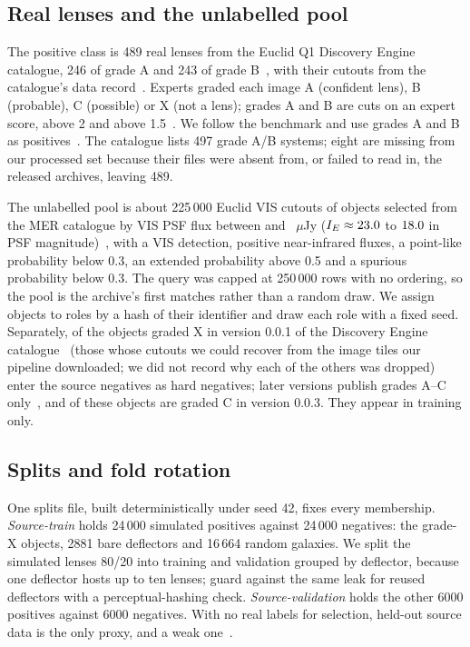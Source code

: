 \subsection{Real lenses and the unlabelled pool}

The positive class is 489 real lenses from the Euclid Q1 Discovery Engine catalogue, 246 of
grade A and 243 of grade B~\citep{discoveryengineA}, with their cutouts from the catalogue's
data record~\citep{discoveryenginecat}. Experts graded each image A (confident lens), B
(probable), C (possible) or X (not a lens); grades A and B are cuts on an expert score, above 2
and above 1.5~\citep[Sect.~6.2]{discoveryengineA}. We follow the benchmark and use grades A and B as
positives~\citep{lines2025simstosky}. The catalogue lists 497 grade A/B systems; eight are
missing from our processed set because their files were absent from, or failed to read in,
the released archives, leaving 489.

The unlabelled pool is about 225\,000 Euclid VIS cutouts of objects selected from the MER
catalogue by VIS PSF flux between \FluxMin{} and \FluxMax{}~$\mu$Jy ($I_E \approx 23.0{}$
to $18.0{}$ in PSF magnitude)~\citep{euclidq1mer}, with a VIS detection, positive
near-infrared fluxes, a point-like probability below 0.3, an extended probability above 0.5
and a spurious probability below 0.3. The query was capped at 250\,000 rows with no ordering,
so the pool is the archive's first matches rather than a random draw. We assign objects to
roles by a hash of their identifier and draw each role with a fixed seed. Separately, \GradeXUsed{}
of the \GradeXAll{} objects graded X in version 0.0.1 of the Discovery Engine
catalogue~\citep{discoveryenginecat001} (those whose cutouts we could recover from the
image tiles our pipeline downloaded; we did not record why each of the others was dropped)
enter the source negatives as hard negatives; later
versions publish grades A--C only~\citep{discoveryenginecat}, and \GradeXnowC{} of these
objects are graded C in version 0.0.3. They appear in training only.

\subsection{Splits and fold rotation}
\label{sec:splits}

One splits file, built deterministically under seed 42, fixes every membership.
\emph{Source-train} holds 24\,000 simulated positives against 24\,000 negatives: the \GradeXUsed{}
grade-X objects, 2881 bare deflectors and 16\,664 random galaxies. We split the simulated
lenses 80/20 into training and validation grouped by deflector, because one deflector hosts up
to ten lenses; \citep{astrovink} guard against the same leak for reused deflectors with a
perceptual-hashing check. \emph{Source-validation} holds the other 6000 positives
against 6000 negatives. With no real labels for selection, held-out source data is the only
proxy, and a weak one~\citep{musgrave2021realitycheck}.

